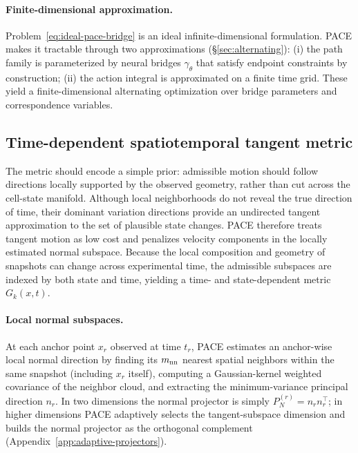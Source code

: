 \paragraph{Finite-dimensional approximation.}
Problem~\eqref{eq:ideal-pace-bridge} is an ideal infinite-dimensional formulation.
PACE makes it tractable through two approximations (\S\ref{sec:alternating}):
(i) the path family is parameterized by neural bridges \(\gamma_\theta\) that satisfy endpoint constraints by construction;
(ii) the action integral is approximated on a finite time grid.
These yield a finite-dimensional alternating optimization over bridge parameters and correspondence variables.


\subsection{Time-dependent spatiotemporal tangent metric}
\label{sec:metric}

The metric should encode a simple prior: admissible motion should follow directions locally supported by the observed geometry, rather than cut across the cell-state manifold. Although local neighborhoods do not reveal the true direction of time, their dominant variation directions provide an undirected tangent approximation to the set of plausible state changes.
PACE therefore treats tangent motion as low cost and penalizes velocity components in the locally estimated normal subspace.
Because the local composition and geometry of snapshots can change across experimental time, the admissible subspaces are indexed by both state and time, yielding a time- and state-dependent metric \(G_k(x,t)\).
	        
        \paragraph{Local normal subspaces.}
        At each anchor point \(x_r\) observed at time \(t_r\), PACE estimates an anchor-wise local normal direction by finding its \(m_{\rm nn}\) nearest spatial neighbors within the same snapshot (including \(x_r\) itself), computing a Gaussian-kernel weighted covariance of the neighbor cloud, and extracting the minimum-variance principal direction \(n_r\).
        In two dimensions the normal projector is simply \(P_N^{(r)}=n_r n_r^\top\); in higher dimensions PACE adaptively selects the tangent-subspace dimension
        and builds the normal projector as the orthogonal complement (Appendix~\ref{app:adaptive-projectors}).
        
